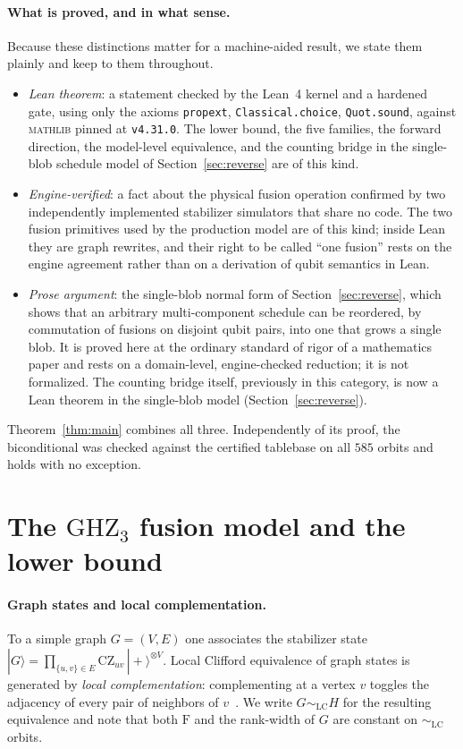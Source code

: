 \documentclass[11pt]{article}
\theoremstyle{definition}
\theoremstyle{remark}
\newcommand{\F}{\mathrm{F}}
\newcommand{\GHZ}{\mathrm{GHZ}_3}
\newcommand{\LC}{\mathrm{LC}}
\newcommand{\code}[1]{\texttt{#1}}
\begin{document}
\paragraph{What is proved, and in what sense.} Because these distinctions matter for a
machine-aided result, we state them plainly and keep to them throughout.
\begin{itemize}[nosep,leftmargin=1.4em]
\item \emph{Lean theorem}: a statement checked by the Lean~4 kernel and a hardened gate, using only
      the axioms \code{propext}, \code{Classical.choice}, \code{Quot.sound}, against
      \textsc{mathlib} pinned at \code{v4.31.0}. The lower bound, the five families, the forward
      direction, the model-level equivalence, and the counting bridge in the single-blob schedule
      model of Section~\ref{sec:reverse} are of this kind.
\item \emph{Engine-verified}: a fact about the physical fusion operation confirmed by two
      independently implemented stabilizer simulators that share no code. The two fusion primitives
      used by the production model are of this kind; inside Lean they are graph rewrites, and their
      right to be called ``one fusion'' rests on the engine agreement rather than on a derivation
      of qubit semantics in Lean.
\item \emph{Prose argument}: the single-blob normal form of Section~\ref{sec:reverse}, which shows
      that an arbitrary multi-component schedule can be reordered, by commutation of fusions on
      disjoint qubit pairs, into one that grows a single blob. It is proved here at the ordinary
      standard of rigor of a mathematics paper and rests on a domain-level, engine-checked
      reduction; it is not formalized. The counting bridge itself, previously in this category, is
      now a Lean theorem in the single-blob model (Section~\ref{sec:reverse}).
\end{itemize}
Theorem~\ref{thm:main} combines all three. Independently of its proof, the biconditional was
checked against the certified tablebase on all $585$ orbits and holds with no exception.

\section{The \texorpdfstring{$\GHZ$}{GHZ3} fusion model and the lower bound}\label{sec:model}

\paragraph{Graph states and local complementation.} To a simple graph $G=(V,E)$ one associates the
stabilizer state $|G\rangle=\prod_{\{u,v\}\in E}\mathrm{CZ}_{uv}\,|{+}\rangle^{\otimes V}$. Local
Clifford equivalence of graph states is generated by \emph{local complementation}: complementing at
a vertex $v$ toggles the adjacency of every pair of neighbors of $v$~\cite{vandennest,bouchet}. We
write $G\sim_{\LC}H$ for the resulting equivalence and note that both $\F$ and the rank-width of $G$
are constant on $\sim_{\LC}$ orbits.
\end{document}
